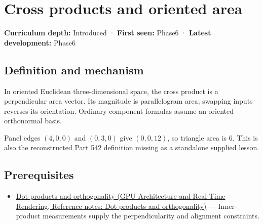 \hypertarget{appendix-2391db8052b1}{}\label{referencestart:appendix-2391db8052b1}
\section{Cross products and oriented area}\label{appendix-2391db8052b1-cross-products-and-oriented-area}

\hypertarget{appendix-2391db8052b1-cross-products-and-oriented-area}{}

\textbf{Curriculum depth:} Introduced · \textbf{First seen:} Phase6 · \textbf{Latest development:} Phase6

\begin{allmightroledefinition}

\subsection{Definition and mechanism}\label{appendix-2391db8052b1-definition-and-mechanism}

\hypertarget{appendix-2391db8052b1-definition-and-mechanism}{}

In oriented Euclidean three-dimensional space, the cross product is a perpendicular area vector. Its magnitude is parallelogram area; swapping inputs reverses its orientation. Ordinary component formulas assume an oriented orthonormal basis.

\end{allmightroledefinition}

Panel edges \((4,0,0)\) and \((0,3,0)\) give \((0,0,12)\), so triangle area is \(6\). This is also the reconstructed Part 542 definition missing as a standalone supplied lesson.

\subsection{Prerequisites}\label{appendix-2391db8052b1-prerequisites}

\hypertarget{appendix-2391db8052b1-prerequisites}{}

\begin{itemize}
\tightlist
\item
  \href{../06-GPU-Architecture-and-Real-Time-Rendering/main.pdf\#nameddest=appendix-8bc4e8fc547c}{Dot products and orthogonality (GPU Architecture and Real-Time Rendering, Reference notes: Dot products and orthogonality)} --- Inner-product measurements supply the perpendicularity and alignment constraints.
\end{itemize}

